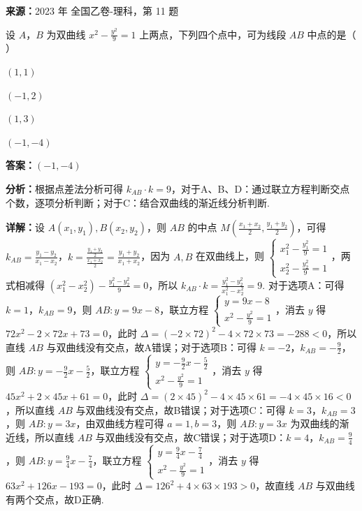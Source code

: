 \begin{question}[points=5]
\textbf{来源：}2023 年 全国乙卷-理科，第 11 题\par
设 $A$，$B$ 为双曲线 $x^2-\frac{y^2}{9}=1$ 上两点，下列四个点中，可为线段 $AB$ 中点的是（ ）
\begin{choices}
  \item $(1,1)$
  \item $(-1,2)$
  \item $(1,3)$
  \item $(-1,-4)$
\end{choices}
\begin{solution}
\textbf{答案：}$(-1,-4)$

\textbf{分析：}根据点差法分析可得 $k_{AB}\cdot k=9$，对于A、B、D：通过联立方程判断交点个数，逐项分析判断；对于C：结合双曲线的渐近线分析判断.

\textbf{详解：}设 $A(x_1,y_1),B(x_2,y_2)$，则 $AB$ 的中点 $M(\frac{x_1+x_2}{2},\frac{y_1+y_2}{2})$，可得 $k_{AB}=\frac{y_1-y_2}{x_1-x_2}$，$k=\frac{\frac{y_1+y_2}{2}}{\frac{x_1+x_2}{2}}=\frac{y_1+y_2}{x_1+x_2}$，因为 $A,B$ 在双曲线上，则 $\begin{cases} x_1^2-\frac{y_1^2}{9}=1 \\ x_2^2-\frac{y_2^2}{9}=1 \end{cases}$，两式相减得 $(x_1^2-x_2^2)-\frac{y_1^2-y_2^2}{9}=0$，所以 $k_{AB}\cdot k=\frac{y_1^2-y_2^2}{x_1^2-x_2^2}=9$. 对于选项A：可得 $k=1$，$k_{AB}=9$，则 $AB:y=9x-8$，联立方程 $\begin{cases} y=9x-8 \\ x^2-\frac{y^2}{9}=1 \end{cases}$，消去 $y$ 得 $72x^2-2\times72x+73=0$，此时 $\Delta=(-2\times72)^2-4\times72\times73=-288<0$，所以直线 $AB$ 与双曲线没有交点，故A错误；对于选项B：可得 $k=-2$，$k_{AB}=-\frac{9}{2}$，则 $AB:y=-\frac{9}{2}x-\frac{5}{2}$，联立方程 $\begin{cases} y=-\frac{9}{2}x-\frac{5}{2} \\ x^2-\frac{y^2}{9}=1 \end{cases}$，消去 $y$ 得 $45x^2+2\times45x+61=0$，此时 $\Delta=(2\times45)^2-4\times45\times61=-4\times45\times16<0$，所以直线 $AB$ 与双曲线没有交点，故B错误；对于选项C：可得 $k=3$，$k_{AB}=3$，则 $AB:y=3x$，由双曲线方程可得 $a=1,b=3$，则 $AB:y=3x$ 为双曲线的渐近线，所以直线 $AB$ 与双曲线没有交点，故C错误；对于选项D：$k=4$，$k_{AB}=\frac{9}{4}$，则 $AB:y=\frac{9}{4}x-\frac{7}{4}$，联立方程 $\begin{cases} y=\frac{9}{4}x-\frac{7}{4} \\ x^2-\frac{y^2}{9}=1 \end{cases}$，消去 $y$ 得 $63x^2+126x-193=0$，此时 $\Delta=126^2+4\times63\times193>0$，故直线 $AB$ 与双曲线有两个交点，故D正确.
\end{solution}
\end{question}

